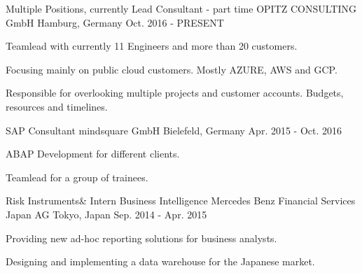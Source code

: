 

\begin{cventries}

  \cventry
    {Multiple Positions, currently Lead Consultant - part time} %
    {OPITZ CONSULTING GmbH} %
    {Hamburg, Germany} %
    {Oct. 2016 - PRESENT} %
    {
      \begin{cvitems}
        \item {Teamlead with currently 11 Engineers and more than 20 customers.}
        \item {Focusing mainly on public cloud customers. Mostly AZURE, AWS and GCP.}
        \item {Responsible for overlooking multiple projects and customer accounts. Budgets, resources and timelines.}
      \end{cvitems}
    }

\cventry
{SAP Consultant} %
{mindsquare GmbH} %
{Bielefeld, Germany} %
{Apr. 2015 - Oct. 2016} %
{
  \begin{cvitems}
    \item {ABAP Development for different clients. }
    \item {Teamlead for a group of trainees. }
  \end{cvitems}
}

  \cventry
    {Risk Instruments\& Intern Business Intelligence} %
    {Mercedes Benz Financial Services Japan AG} %
    {Tokyo, Japan} %
    {Sep. 2014 - Apr. 2015} %
    {
      \begin{cvitems} %
        \item {Providing new ad-hoc reporting solutions for business analysts.}
        \item {Designing and implementing a data warehouse for the Japanese market.}
      \end{cvitems}
    }


\end{cventries}
